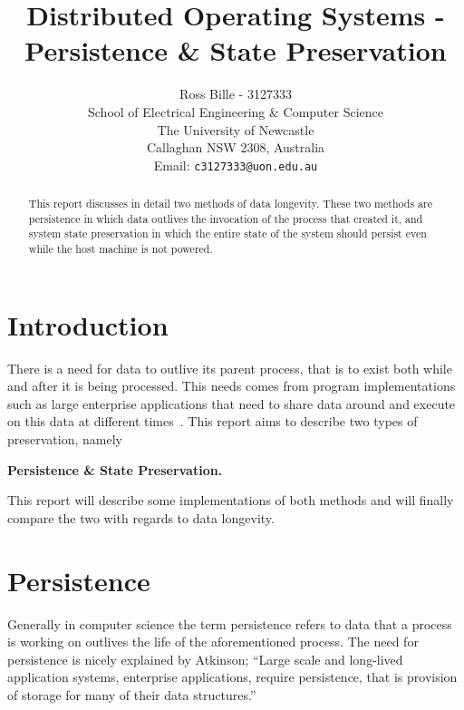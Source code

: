 \documentclass[a4paper,12pt]{article}
\newenvironment{boxit}{\begin{lrbox}{\savepar}
        \begin{minipage}[b]{4.6in}}
        {\end{minipage}\end{lrbox}\fbox{\usebox{\savepar}}}
\begin{document}
%
\title{\bf Distributed Operating Systems - Persistence \& State Preservation}
%
\author{Ross Bille - 3127333\\
School of Electrical Engineering \& Computer Science\\
The University of Newcastle\\ Callaghan NSW 2308, Australia\\
Email: \texttt{c3127333@uon.edu.au} } 

\maketitle


\newpage
\begin{abstract}%
\noindent This report discusses in detail two methods of data longevity. These two methods are persistence in which data outlives the invocation of the process that created it, and system state preservation in which the entire state of the system should persist even while the host machine is not powered.
\end{abstract}

\pagebreak

\tableofcontents

\pagebreak

\section{Introduction}
There is a need for data to outlive its parent process, that is to exist both while and after it is being processed. This needs comes from program implementations such as large enterprise applications that need to share data around and execute on this data at different times~\citep{persistenceandjava}. This report aims to describe two types of preservation, namely 
\begin{center}
    \begin{boxit}
        \begin{center}
            \textbf{Persistence \& State Preservation.}
        \end{center}
    \end{boxit}
\end{center}
This report will describe some implementations of both methods and will finally compare the two with regards to data longevity.
%
\section{Persistence}\label{sec:persistence}
Generally in computer science the term persistence refers to data that a process is working on outlives the life of the aforementioned  process. 
The need for persistence is nicely explained by Atkinson;
``Large scale and long-lived application systems, enterprise applications, require persistence, that is provision of storage for many of their data structures.''~\citep[p.~1]{persistenceandjava}
\end{document}
